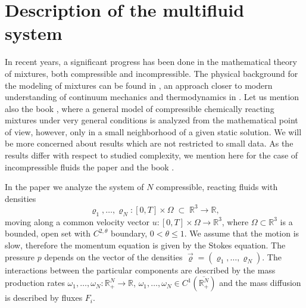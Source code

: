 \documentclass[11pt]{article}
\newcommand{\ddiv}{\mathrm{div\,}}
\numberwithin{equation}{section}
\numberwithin{tw}{section}
\begin{document}
\section{Description of the multifluid system}
In recent years, a significant progress has been done in the mathematical theory of mixtures, both compressible and incompressible. The physical background for the modeling of mixtures can be found in \cite{Pr}, an approach closer to modern understanding of continuum mechanics and thermodynamics  in \cite{RaTa}. Let us mention also the book \cite{Gi}, where a general model of compressible chemically reacting mixtures under very general conditions is analyzed from the mathematical point of view, however, only in a small neighborhood of a given static solution. We will be more concerned about results which are not restricted to small data. As the results differ with respect to studied complexity, we mention here for the case of incompressible fluids the paper \cite{Ro} and the book \cite{Ot}.



In the paper we analyze the system of $N$ compressible, reacting fluids with densities $$\varrho_1, \dots, \varrho_N\colon [0,T]\times\Omega \; \subset \; \mathbb{R}^3 \to \mathbb{R},$$ moving along a common velocity vector $u\colon [0,T]\times\Omega\to \mathbb{R}^3$, where $\Omega\subset\mathbb{R}^3$ is a bounded, open set with $C^{2,\theta}$ boundary, $0<\theta\leq 1$.  We assume that the motion is slow,
therefore the momentum equation is given by the Stokes equation.
The pressure $p$ depends on the vector of the densities $\vec\varrho=(\varrho_1,\dots, \varrho_N)$.
%
The interactions between the particular components are described by the mass production rates $\omega_1,\dots,\omega_N\colon\mathbb{R}^N_+\to\mathbb{R}$, $\omega_1,\dots,\omega_N\in C^1(\overline{\mathbb{R}_+^N})$ and the mass diffusion is described by fluxes $F_i$. 
\end{document}
